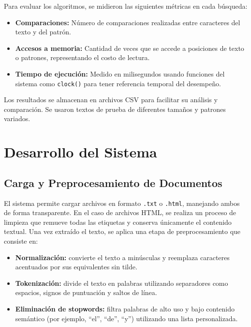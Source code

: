 \documentclass[9pt,letterpaper,onecolumn]{rho-class/rho}
\begin{document}
Para evaluar los algoritmos, se midieron las siguientes métricas en cada búsqueda:

\begin{itemize}
    \item \textbf{Comparaciones:}  
    Número de comparaciones realizadas entre caracteres del texto y del patrón.

    \item \textbf{Accesos a memoria:}  
    Cantidad de veces que se accede a posiciones de texto o patrones, representando el costo de lectura.

    \item \textbf{Tiempo de ejecución:}  
    Medido en milisegundos usando funciones del sistema como \texttt{clock()} para tener referencia temporal del desempeño.
\end{itemize}

Los resultados se almacenan en archivos CSV para facilitar su análisis y comparación. Se usaron textos de prueba de diferentes tamaños y patrones variados.



\section{Desarrollo del Sistema}

\subsection{Carga y Preprocesamiento de Documentos}

El sistema permite cargar archivos en formato \texttt{.txt} o \texttt{.html}, manejando ambos de forma transparente. En el caso de archivos HTML, se realiza un proceso de limpieza que remueve todas las etiquetas y conserva únicamente el contenido textual. Una vez extraído el texto, se aplica una etapa de preprocesamiento que consiste en:

\begin{itemize}
    \item \textbf{Normalización:} convierte el texto a minúsculas y reemplaza caracteres acentuados por sus equivalentes sin tilde.
    \item \textbf{Tokenización:} divide el texto en palabras utilizando separadores como espacios, signos de puntuación y saltos de línea.
    \item \textbf{Eliminación de stopwords:} filtra palabras de alto uso y bajo contenido semántico (por ejemplo, “el”, “de”, “y”) utilizando una lista personalizada.
\end{itemize}
\end{document}
